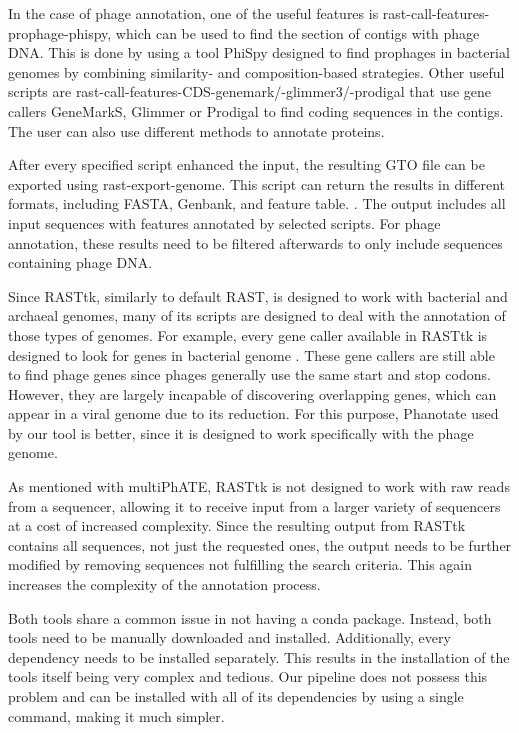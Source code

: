 In the case of phage annotation, one of the useful features is rast-call-features-prophage-phispy, which can be used to find the section of contigs with phage DNA. This is done by using a tool PhiSpy designed to find prophages in bacterial genomes by combining similarity- and composition-based strategies. Other useful scripts are rast-call-features-CDS-genemark/-glimmer3/-prodigal that use gene callers GeneMarkS, Glimmer or Prodigal to find coding sequences in the contigs. The user can also use different methods to annotate proteins.

After every specified script enhanced the input, the resulting GTO file can be exported using rast-export-genome. This script can return the results in different formats, including FASTA, Genbank, and feature table. \cite{brettin2015rasttk}. The output includes all input sequences with features annotated by selected scripts. For phage annotation, these results need to be filtered afterwards to only include sequences containing phage DNA.

Since RASTtk, similarly to default RAST, is designed to work with bacterial and archaeal genomes, many of its scripts are designed to deal with the annotation of those types of genomes. For example, every gene caller available in RASTtk is designed to look for genes in bacterial genome \cite{brettin2015rasttk}. These gene callers are still able to find phage genes since phages generally use the same start and stop codons. However, they are largely incapable of discovering overlapping genes, which can appear in a viral genome due to its reduction. For this purpose, Phanotate used by our tool is better, since it is designed to work specifically with the phage genome.

As mentioned with multiPhATE, RASTtk is not designed to work with raw reads from a sequencer, allowing it to receive input from a larger variety of sequencers at a cost of increased complexity. Since the resulting output from RASTtk contains all sequences, not just the requested ones, the output needs to be further modified by removing sequences not fulfilling the search criteria. This again increases the complexity of the annotation process.

Both tools share a common issue in not having a conda package. Instead, both tools need to be manually downloaded and installed. Additionally, every dependency needs to be installed separately. This results in the installation of the tools itself being very complex and tedious. Our pipeline does not possess this problem and can be installed with all of its dependencies by using a single command, making it much simpler.
